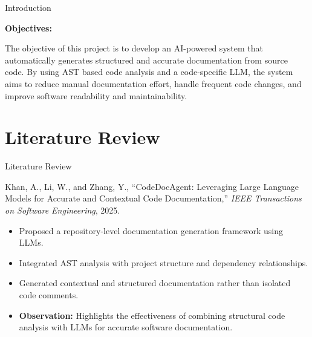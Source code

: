 \documentclass{beamer}
\begin{document}
\begin{frame}{Introduction}


\item \textbf{Objectives:}
\begin{itemize}
\justifying
    The objective of this project is to develop an AI-powered system that automatically generates structured and accurate documentation from source code. By using AST based code analysis and a code-specific LLM, the system aims to reduce manual documentation effort, handle frequent code changes, and improve software readability and maintainability.




    
    
\end{itemize}
\end{frame}


\section{Literature Review}

\begin{frame}{Literature Review}
\justifying
\hypertarget{lit1}{}
\begin{block}{Khan, A., Li, W., and Zhang, Y.,
“CodeDocAgent: Leveraging Large Language Models for Accurate and Contextual Code Documentation,”
\textit{IEEE Transactions on Software Engineering}, 2025.}
\end{block}

\begin{itemize}
\justifying
    \item Proposed a repository-level documentation generation framework using LLMs.
    \item Integrated AST analysis with project structure and dependency relationships.
    \item Generated contextual and structured documentation rather than isolated code comments.
    \item \textbf{Observation:} Highlights the effectiveness of combining structural code analysis with LLMs for accurate software documentation.
\end{itemize}
\end{frame}
\end{document}

